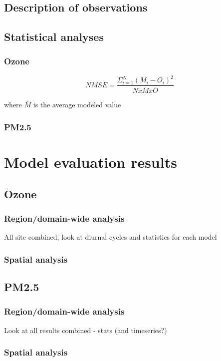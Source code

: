   \subsection{Description of observations}
  
  \subsection{Statistical analyses}
   \subsubsection{Ozone}
   
\begin {equation}
 NMSE = \frac{\Sigma_{i=1}^N (M_i - O_i)^2}{N x \overline{M} x \overline{O}}
\end {equation}  

where $\overline{M}$ is the average modeled value
   \subsubsection{PM2.5}
 

\section{Model evaluation results}
\label{sec:results}
 
  \subsection{Ozone}
    \subsubsection{Region/domain-wide analysis}
  All site combined, look at diurnal cycles and statistics for each model 
    \subsubsection{Spatial analysis}
  \subsection{PM2.5}
   \subsubsection{Region/domain-wide analysis}
  Look at all results combined - stats (and timeseries?)
   \subsubsection{Spatial analysis}
  
